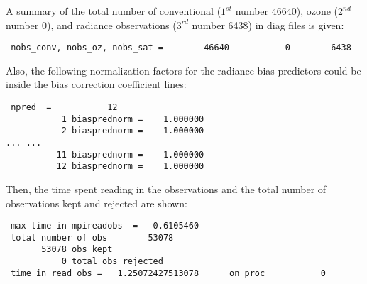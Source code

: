 A summary of the total number of conventional ($1^{st}$ number 46640), ozone ($2^{nd}$ number 0), and 
radiance observations ($3^{rd}$ number 6438) in diag files is given:
\begin{scriptsize}
\begin{verbatim}
 nobs_conv, nobs_oz, nobs_sat =        46640           0        6438
\end{verbatim}
\end{scriptsize}

Also, the following normalization factors for the radiance bias predictors could be inside the bias correction coefficient lines:
\begin{scriptsize}
\begin{verbatim}
 npred  =           12
           1 biasprednorm =    1.000000
           2 biasprednorm =    1.000000
... ...
          11 biasprednorm =    1.000000
          12 biasprednorm =    1.000000
\end{verbatim}
\end{scriptsize}

Then, the time spent reading in the observations and the total number of observations kept and rejected are shown:
\begin{scriptsize}
\begin{verbatim}
 max time in mpireadobs  =   0.6105460
 total number of obs        53078
       53078 obs kept
           0 total obs rejected
 time in read_obs =   1.25072427513078      on proc           0
\end{verbatim}
\end{scriptsize}

